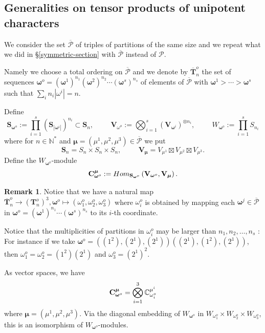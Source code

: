 \documentclass[11pt]{article}
\theoremstyle{definition}
\newtheorem{rema}[theo]{Remark}
\numberwithin{equation}{section}
\newcommand{\calP}{\mathcal{P}}
\newcommand{\C}{{\bf C}}
\newcommand{\N}{{\mathbb{N}}}
\newcommand{\muhat}{{\boldsymbol \mu}}
\newcommand{\omegahat}{{\boldsymbol \omega}}
\begin{document}
\subsection{Generalities on tensor products of unipotent characters}



We consider the set $\overline{\calP}$ of triples of partitions of the same size and we repeat what we did in \S \ref{symmetric-section} with $\overline{\calP}$ instead of $\calP$. 

Namely we choose  a total ordering on $\overline{\calP}$ and we denote by $\overline{\mathbf{T}}_n^o$ the set of sequences $\omegahat^o=(\omegahat^1)^{n_1}(\omegahat^2)^{n_2}\cdots(\omegahat^s)^{n_s}$ of elements of $\overline{\calP}$ with $\omegahat^1>\cdots>\omegahat^s$ such that $\sum_in_i|\omega^i|=n$.

Define 
$$
{\mathbf{S}}_{\omegahat^o}:=\prod_{i=1}^s({\mathbf{S}}_{|\omegahat^i|})^{n_i}\subset {\mathbf{S}}_n,\hspace{1cm}{\mathbf{V}}_{\omega^o}:=\bigotimes_{i=1}^s({\mathbf{V}}_{\omegahat^i})^{\otimes n_i},\hspace{1cm}W_{\omegahat^o}:=\prod_{i=1}^s S_{n_i}
$$
where for $n\in\N^*$ and $\muhat=(\mu^1,\mu^2,\mu^3)\in\overline{\calP}$ we put
$$
{\mathbf{S}}_n=S_n\times S_n\times S_n,\hspace{1cm}{\mathbf{V}}_\muhat=V_{\mu^1}\boxtimes V_{\mu^2}\boxtimes V_{\mu^3}.
$$
Define the $W_{\omegahat^o}$-module
$$
\C^\muhat_{\omegahat^o}:={\rm Hom}_{{\mathbf{S}}_{\omegahat^o}}\left({\mathbf{V}}_{\omegahat^o},{\mathbf{V}}_\muhat\right).
$$
\begin{rema}Notice that we have a natural map $\overline{{\mathbf{T}}}_n^o\rightarrow ({\mathbf{T}}_n^o)^3, \omegahat^o\mapsto (\omega^o_1,\omega^o_2,\omega^o_3)$ where $\omega^o_i$ is obtained by mapping each $\omegahat^j\in\overline{\calP}$ in $\omegahat^o=(\omegahat^1)^{n_1}\cdots(\omegahat^s)^{n_s}$ to its $i$-th coordinate. 
	
	Notice that the multiplicities of partitions in $\omega_i^o$ may be larger than $n_1,n_2,\dots,n_s$ : 
	For instance if we take $\omegahat^o=((1^2),(2^1),(2^1))((2^1),(1^2),(2^1))$, then $\omega_1^o=\omega_2^o=(1^2)(2^1)$ and $\omega^o_3=(2^1)^2$. 
	
	As vector spaces, we have
	$$
	\C^\muhat_{\omegahat^o}=\bigotimes_{i=1}^3\mathbb{C}^{\mu^i}_{\omega_i ^o}
	$$
	where $\muhat=(\mu^1,\mu^2,\mu^3)$. Via the diagonal embedding of $W_{\omegahat^o}$ in $W_{\omega^o_1}\times W_{\omega^o_2}\times W_{\omega^o_3}$, this is an isomorphism of $W_{\omegahat^o}$-modules.
	
	
\end{rema}
\end{document}
